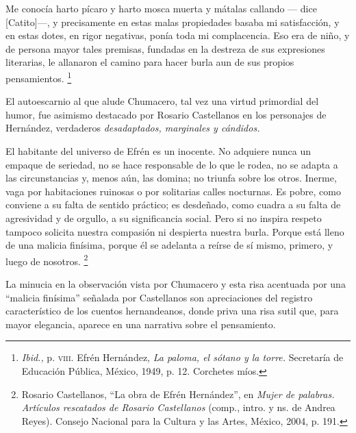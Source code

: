 \documentclass[14pt,twoside,final]{extbook} %
\let\oldfootnote\footnote
\renewcommand\footnote[1]{%
\oldfootnote{\hspace{1mm}#1}}
\begin{document}
\begin{quoting}
Me conocía harto pícaro y harto mosca muerta y mátalas callando --- dice [Catito]---, y precisamente en estas malas propiedades basaba mi satisfacción, y en estas dotes, en rigor negativas, ponía toda mi complacencia. Eso era de niño, y de persona mayor tales premisas, fundadas en la destreza de sus expresiones literarias, le allanaron el camino para hacer burla aun de sus propios pensamientos.\footnote{\emph{Ibid.,} p. \textsc{viii}. Efrén Hernández, \emph{La paloma, el sótano y la torre.} Secretaría de Educación Pública, México, 1949, p. 12. Corchetes míos.}
\end{quoting}
El autoescarnio al que alude Chumacero, tal vez una virtud primordial del humor, fue asimismo destacado por Rosario Castellanos en los personajes de Hernández, verdaderos \emph{desadaptados, marginales y cándidos.}
\begin{quoting}
El habitante del universo de Efrén es un inocente. No adquiere nunca un empaque de seriedad, no se hace responsable de lo que le rodea, no se adapta a las circunstancias y, menos aún, las domina; no
triunfa sobre los otros. Inerme, vaga por habitaciones ruinosas o por solitarias calles nocturnas. Es pobre, como conviene a su falta de sentido práctico; es desdeñado, como cuadra a su falta de agresividad y de orgullo, a su significancia social. Pero si no inspira respeto tampoco solicita nuestra compasión ni despierta nuestra burla. Porque está lleno de una malicia finísima, porque él se
adelanta a reírse de sí mismo, primero, y luego de nosotros.\footnote{Rosario Castellanos, ``La obra de Efrén Hernández'', en \emph{Mujer de palabras. Artículos rescatados de Rosario Castellanos} (comp., intro. y ns. de Andrea Reyes). Consejo Nacional para la Cultura y las Artes, México,
2004, p. 191.}
\end{quoting}
La minucia en la observación vista por Chumacero y esta risa acentuada por una ``malicia finísima'' señalada por Castellanos son apreciaciones del registro característico de los cuentos hernandeanos, donde priva una risa sutil que, para mayor elegancia, aparece en una narrativa sobre el pensamiento.
\end{document}

